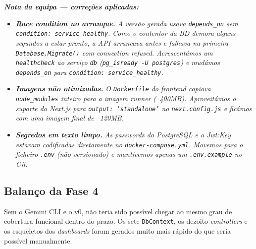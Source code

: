 
\noindent\textit{\textbf{Nota da equipa --- correções aplicadas:}}
\begin{itemize}
    \item \textit{\textbf{\textit{Race condition} no arranque.} A versão gerada usava \texttt{depends\_on} sem \texttt{condition: service\_healthy}. Como o contentor da BD demora alguns segundos a estar pronto, a API arrancava antes e falhava na primeira \texttt{Database.Migrate()} com \textit{connection refused}. Acrescentámos um \texttt{healthcheck} ao serviço \texttt{db} (\texttt{pg\_isready -U postgres}) e mudámos \texttt{depends\_on} para \texttt{condition: service\_healthy}.}
    \item \textit{\textbf{Imagens não otimizadas.} O \texttt{Dockerfile} do \textit{frontend} copiava \texttt{node\_modules} inteiro para a imagem \textit{runner} (~400MB). Aproveitámos o suporte do Next.js para \texttt{output: 'standalone'} no \texttt{next.config.js} e ficámos com uma imagem final de ~120MB.}
    \item \textit{\textbf{Segredos em texto limpo.} As \textit{passwords} do PostgreSQL e a \textit{Jwt:Key} estavam codificadas diretamente no \texttt{docker-compose.yml}. Movemos para o ficheiro \texttt{.env} (não versionado) e mantivemos apenas um \texttt{.env.example} no Git.}
\end{itemize}

\subsection{Balanço da Fase 4}\label{subsec:ia_impl_balanco}

Sem o Gemini CLI e o v0, não teria sido possível chegar ao mesmo grau de cobertura funcional dentro do prazo. Os sete \texttt{DbContext}, os dezoito \textit{controllers} e os esqueletos dos \textit{dashboards} foram gerados muito mais rápido do que seria possível manualmente.

